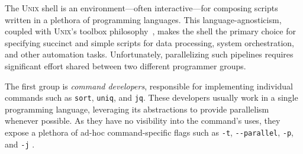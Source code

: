 \documentclass[sigplan, review, screen, anonymous]{acmart}
\newcommand{\ttt}[1]{\texttt{#1}}
\newcommand{\kk}[1]{[{\color{magenta}kk: #1}]}
\newcommand\blfootnote[1]{%
  \begingroup
  \renewcommand\thefootnote{}\footnote{#1}%
  \addtocounter{footnote}{-1}%
  \endgroup
}
\newcommand{\unix}{{\scshape Unix}\xspace}
\begin{document}
%
% 
% 

The \unix shell is an environment---often interactive---for composing scripts written in a plethora of programming languages.
This language-agnosticism, coupled with \unix's toolbox philosophy~\cite{mcilroy1978unix}, makes the shell the primary choice for specifying succinct and simple scripts for data processing, system orchestration, and other automation tasks.
Unfortunately, parallelizing such pipelines requires significant effort shared between two different programmer groups. %

The first group is \emph{command developers}, responsible for implementing individual commands such as \ttt{sort}, \ttt{uniq}, and \ttt{jq}.
These developers usually work in a single programming language, leveraging its abstractions to provide parallelism whenever possible.
As they have no visibility into the command's uses, they expose a plethora of ad-hoc command-specific flags such as \ttt{-t}, \ttt{-}\ttt{-parallel}, \ttt{-p}, and \ttt{-j} %
\cite{pasetto2011comparative, mcilroy1993engineering, stallman1991gnu}.
\end{document}
